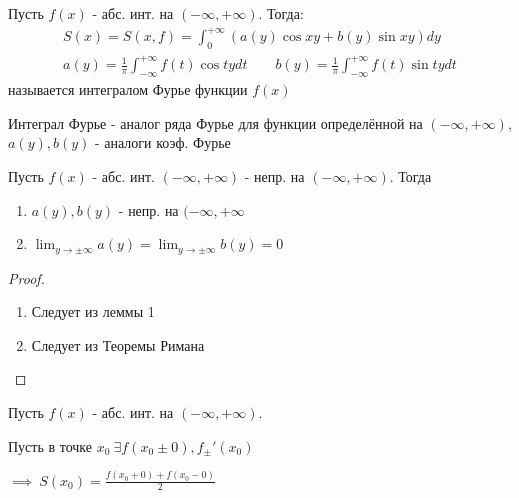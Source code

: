 \documentclass{article}
\begin{document}
\begin{definition}
  Пусть $f(x)$ - абс. инт. на $(-\infty,+\infty)$. Тогда:
  \begin{gather*}
    S(x)=S(x,f)=\int_{0}^{+\infty}(a(y)\cos xy+ b(y) \sin xy)dy \\ 
    a(y)=\frac{1}{\pi}\int_{-\infty}^{+\infty}f(t)\cos ty dt \qquad
    b(y)=\frac{1}{\pi}\int_{-\infty}^{+\infty}f(t)\sin ty dt
  \end{gather*}
  называется интегралом Фурье функции $f(x)$
\end{definition}
\begin{remark}
  Интеграл Фурье - аналог ряда Фурье для функции определённой на $(-\infty,+\infty)$,
  $a(y),b(y)$ - аналоги коэф. Фурье
\end{remark}
\begin{lemma}
  Пусть $f(x)$ - абс. инт. $(-\infty,+\infty)$ - непр. на $(-\infty,+\infty)$. Тогда
  \begin{enumerate}
    \item $a(y),b(y)$ - непр. на $(-\infty,+\infty$
    \item $\lim_{y\to \pm\infty} a(y)=\lim_{y\to \pm\infty} b(y) = 0$
  \end{enumerate}
\end{lemma}
\begin{proof}
  \phantom{.}

  \begin{enumerate}
    \item Следует из леммы 1 
    \item Следует из Теоремы Римана
  \end{enumerate}
\end{proof}
\begin{theorem}
  Пусть $f(x)$ - абс. инт. на $(-\infty,+\infty)$.

  Пусть в точке $x_0 \ \exists f(x_0\pm 0), f_{\pm}'(x_0)$

  $\implies \ S(x_0)=\frac{f(x_0+0)+f(x_0-0)}{2}$
\end{theorem}
\end{document}
